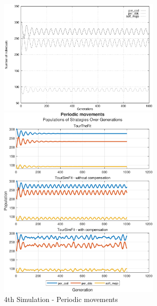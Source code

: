 \documentclass[12pt]{article}
\begin{document}
	\begin{figure}[h]
	      \centering
		  \includegraphics[width=0.7\textwidth]{RefPaperFigures/fig4.jpeg}\par\vspace{0.5em}
	      \includegraphics[width=0.7\textwidth]{Periodic movements.pdf}
	      \caption{4th Simulation - Periodic movements}
	      \label{fig:Periodic movements}
	\end{figure}
\end{document}
